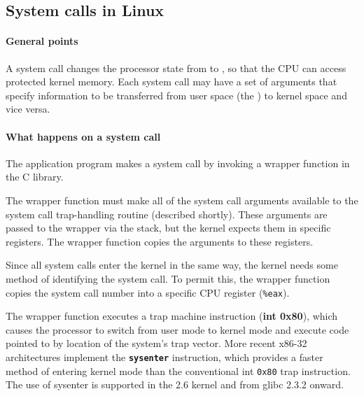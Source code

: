 \documentclass{note}
\begin{document}
{\subsection{System calls in Linux}
\paragraph{General points}
\bit
\w A system call changes the processor state from  to , so that the CPU can access protected kernel memory.
\w Each system call may have a set of arguments that specify information to be
transferred from user space (the ) to
kernel space and vice versa. 
\eit

\paragraph{What happens on a system call}
\ben
\w The application program makes a system call by invoking a wrapper function
   in the C library.

\w The wrapper function must make all of the system call arguments available to
the system call trap-handling routine (described shortly). These arguments are
passed to the wrapper via the stack, but the kernel expects them in specific
registers. The wrapper function copies the arguments to these registers.

\w Since all system calls enter the kernel in the same way, the kernel needs
some method of identifying the system call. To permit this, the wrapper function
copies the system call number into a specific CPU register (\verb+%eax+).

\w The wrapper function executes a trap machine instruction (\textbf{int
  0x80}), which causes the processor to switch from user mode to kernel mode
and execute code pointed to by location  of the system's trap vector.
More recent x86-32 architectures implement the \textbf{\texttt{sysenter}}
instruction, which 
provides a faster method of entering kernel mode than the conventional
int \texttt{0x80} trap instruction. The use of sysenter is supported in the
2.6 kernel and from glibc 2.3.2 onward.

}
\end{document}
